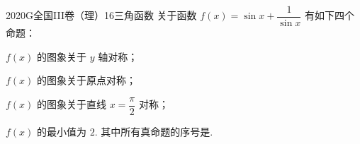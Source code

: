 
\begin{problem}{2020}{G}{全国III卷（理）}{16}{三角函数}
关于函数 $ f(x)=\sin x+\dfrac{1}{\sin x} $ 有如下四个命题：

 $ f(x) $ 的图象关于 $ y $ 轴对称；

 $ f(x) $ 的图象关于原点对称；

 $ f(x) $ 的图象关于直线 $ x=\dfrac{\pi}{2} $ 对称；

 $ f(x) $ 的最小值为 $ 2 $.
其中所有真命题的序号是\underline{\hspace{1cm}}.
\end{problem}

\begin{answer}

\end{answer}

\begin{solutions}

\end{solutions}